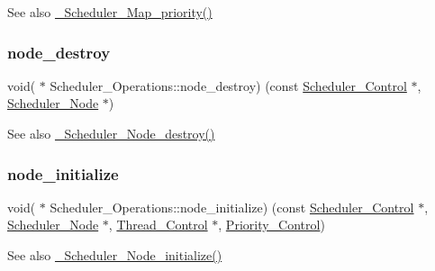 \begin{DoxySeeAlso}{See also}
\mbox{\hyperlink{group__RTEMSScoreScheduler_ga01bd5513405dcafef3306676c55959c6}{\+\_\+\+Scheduler\+\_\+\+Map\+\_\+priority()}} 
\end{DoxySeeAlso}
\mbox{\label{structScheduler__Operations_a97192f2e0cbd200bcc9dbbc76eb6b994}} 
\subsubsection{\texorpdfstring{node\_destroy}{node\_destroy}}
{\footnotesize\ttfamily void( $\ast$ Scheduler\+\_\+\+Operations\+::node\+\_\+destroy) (const \mbox{\hyperlink{struct__Scheduler__Control}{Scheduler\+\_\+\+Control}} $\ast$, \mbox{\hyperlink{structScheduler__Node}{Scheduler\+\_\+\+Node}} $\ast$)}

\begin{DoxySeeAlso}{See also}
\mbox{\hyperlink{group__RTEMSScoreScheduler_ga51626159a058109c378e2142c0e2d548}{\+\_\+\+Scheduler\+\_\+\+Node\+\_\+destroy()}} 
\end{DoxySeeAlso}
\mbox{\label{structScheduler__Operations_a9b86359bc31f966e7093f40ea0b10e0f}} 
\subsubsection{\texorpdfstring{node\_initialize}{node\_initialize}}
{\footnotesize\ttfamily void( $\ast$ Scheduler\+\_\+\+Operations\+::node\+\_\+initialize) (const \mbox{\hyperlink{struct__Scheduler__Control}{Scheduler\+\_\+\+Control}} $\ast$, \mbox{\hyperlink{structScheduler__Node}{Scheduler\+\_\+\+Node}} $\ast$, \mbox{\hyperlink{struct__Thread__Control}{Thread\+\_\+\+Control}} $\ast$, \mbox{\hyperlink{group__RTEMSScorePriority_ga59d02b58072d31a9a1cfe644557aefe2}{Priority\+\_\+\+Control}})}

\begin{DoxySeeAlso}{See also}
\mbox{\hyperlink{group__RTEMSScoreScheduler_ga6305be03088f2eda4f85c186a3bfd495}{\+\_\+\+Scheduler\+\_\+\+Node\+\_\+initialize()}} 
\end{DoxySeeAlso}
\mbox{\label{structScheduler__Operations_a4666ee944118828f44b69a218d200c65}} 
